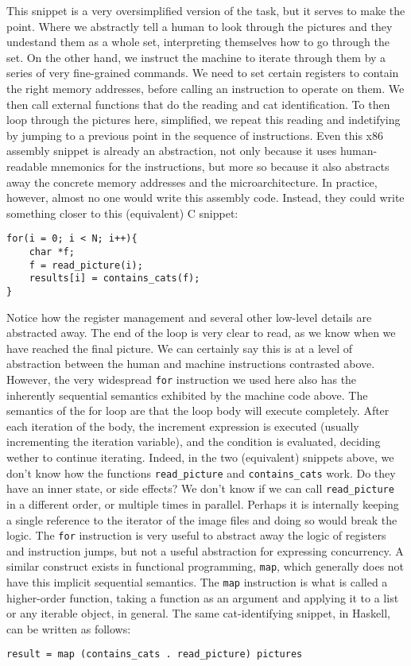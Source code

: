 This snippet is a very oversimplified version of the task, but it serves to make the point.
Where we abstractly tell a human to look through the pictures and they undestand them as a whole set, interpreting themselves how to go through the set.
On the other hand, we instruct the machine to iterate through them by a series of very fine-grained commands.
We need to set certain registers to contain the right memory addresses, before calling an instruction to operate on them.
We then call external functions that do the reading and cat identification.
To then loop through the pictures here, simplified, we repeat this reading and indetifying by jumping to a previous point in the sequence of instructions.
Even this x86 assembly snippet is already an abstraction, not only because it uses human-readable mnemonics for the instructions, but more so because it also abstracts away the concrete memory addresses and the microarchitecture.
In practice, however, almost no one would write this assembly code. Instead, they could write something closer to this (equivalent) C snippet:
\begin{verbatim}
for(i = 0; i < N; i++){
    char *f;
    f = read_picture(i);
    results[i] = contains_cats(f); 
}
\end{verbatim}

Notice how the register management and several other low-level details are abstracted away.
The end of the loop is very clear to read, as we know when we have reached the final picture.
We can certainly say this is at a level of abstraction between the human and machine instructions contrasted above.
However, the very widespread \texttt{for} instruction we used here also has the inherently sequential semantics exhibited by the machine code above.
The semantics of the for loop are that the loop body will execute completely.
After each iteration of the body, the increment expression is executed (usually incrementing the iteration variable), and the condition is evaluated, deciding wether to continue iterating.
Indeed, in the two (equivalent) snippets above, we don't know how the functions \texttt{read\_picture} and \texttt{contains\_cats} work.
Do they have an inner state, or side effects?
We don't know if we can call \texttt{read\_picture} in a different order, or multiple times in parallel.
Perhaps it is internally keeping a single reference to the iterator of the image files and doing so would break the logic.
The \texttt{for} instruction is very useful to abstract away the logic of registers and instruction jumps, but not a useful abstraction for expressing concurrency.
A similar construct exists in functional programming, \texttt{map}, which generally does not have this implicit sequential semantics.
The \texttt{map} instruction is what is called a higher-order function, taking a function as an argument and applying it to a list or any iterable object, in general.
The same cat-identifying snippet, in Haskell, can be written as follows:
\begin{verbatim}
result = map (contains_cats . read_picture) pictures
\end{verbatim}

